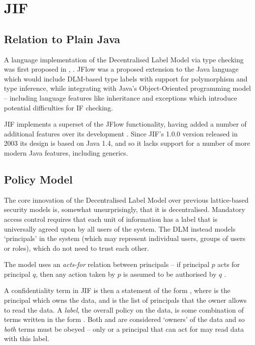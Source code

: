 \newpage

\section{JIF}

\subsection{Relation to Plain Java}

A language implementation of the Decentralised Label Model via type checking was first proposed in , \cite{myers1999jflow}. JFlow was a proposed extension to the Java language which would include DLM-based type labels with support for polymorphism and type inference, while integrating with Java's Object-Oriented programming model -- including language features like inheritance and exceptions which introduce potential difficulties for IF checking.

JIF implements a superset of the JFlow functionality, having added a number of additional features over its development \cite{jifwebsite}. Since JIF's 1.0.0 version released in 2003 its design is based on Java 1.4, and so it lacks support for a number of more modern Java features, including generics.

\subsection{Policy Model}

The core innovation of the Decentralised Label Model over previous lattice-based security models is, somewhat unsurprisingly, that it is decentralised. Mandatory access control requires that each unit of information has a label that is universally agreed upon by all users of the system. The DLM instead models `principals' in the system (which may represent individual users, groups of users or roles), which do not need to trust each other.

The model uses an \textit{acts-for} relation between principals -- if principal $ p $ acts for principal $ q $, then any action taken by $ p $ is assumed to be authorised by $ q $ \cite{myers2000dlm}.

A confidentiality term in JIF is then a statement of the form , where  is the principal which owns the data, and  is the list of principals that the owner allows to read the data. A \textit{label}, the overall policy on the data, is some combination of terms written in the form . Both  and  are considered `owners' of the data and so \textit{both} terms must be obeyed -- only  or a principal that can act for  may read data with this label.



